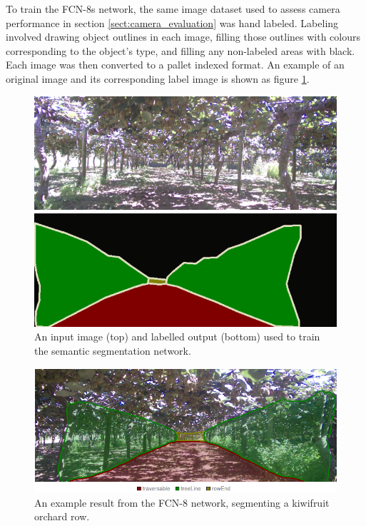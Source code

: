 \documentclass[preprint,authoryear,12pt]{elsarticle}
\begin{document}
        To train the FCN-8s network, the same image dataset used to assess camera performance in section \ref{sect:camera_evaluation} was hand labeled.
    	Labeling involved drawing object outlines in each image, filling those outlines with colours corresponding to the object's type, and filling any non-labeled areas with black.
        Each image was then converted to a pallet indexed format.
    	An example of an original image and its corresponding label image is shown as figure \ref{fig:segImgLabelPair}.

        \begin{figure}[htb]
            \centering
            \includegraphics[width=\linewidth]{imgs/photos/segImgLabelPair_trimmed.png}
            \caption{
                An input image (top) and labelled output (bottom) used to train the semantic segmentation network.
            }
            \label{fig:segImgLabelPair}
        \end{figure}

        \begin{figure}[htb]
            \centering
            \includegraphics[width=\linewidth]{imgs/photos/semSegRowResults.png}
            \caption{
                An example result from the FCN-8 network, segmenting a kiwifruit orchard row.
            }
            \label{fig:semSegRowResults}
        \end{figure}
\end{document}
